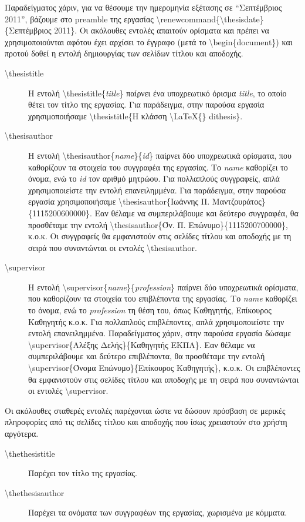 \documentclass{dithesis}
\begin{document}
Παραδείγματος χάριν, για να θέσουμε την ημερομηνία εξέτασης σε ``Σεπτέμβριος
2011'', βάζουμε στο preamble της εργασίας 
\textbackslash{renewcommand}\{\textbackslash{thesisdate}\}\{Σεπτέμβριος 2011\}.
Οι ακόλουθες εντολές απαιτούν ορίσματα και πρέπει να χρησιμοποιούνται αφότου
έχει αρχίσει το έγγραφο (μετά το \textbackslash{begin}\{document\}) και προτού
δοθεί η εντολή δημιουργίας των σελίδων τίτλου και αποδοχής.
\begin{description}
\item[\textbackslash{thesistitle}]
  Η εντολή \textbackslash{thesistitle}\{\textit{title}\} παίρνει ένα 
  υποχρεωτικό όρισμα \textit{title}, το οποίο θέτει τον τίτλο της εργασίας.
  Για παράδειγμα, στην παρούσα εργασία χρησιμοποιήσαμε
  \textbackslash{thesistitle}\{Η κλάσση \textbackslash{LaTeX}\{\} dithesis\}.
\item[\textbackslash{thesisauthor}]
  Η εντολή \textbackslash{thesisauthor}\{\textit{name}\}\{\textit{id}\} παίρνει
  δύο υποχρεωτικά ορίσματα, που καθορίζουν τα στοιχεία του συγγραφέα της
  εργασίας.
  Το \textit{name} καθορίζει το όνομα, ενώ το \textit{id} τον αριθμό μητρώου.
  Για πολλαπλούς συγγραφείς, απλά χρησιμοποιείστε την εντολή επανειλημμένα.
  Για παράδειγμα, στην παρούσα εργασία χρησιμοποιήσαμε
  \textbackslash{thesisauthor}\{Ιωάννης Π. Μαντζουράτος\}\{1115200600000\}.
  Εαν θέλαμε να συμπεριλάβουμε και δεύτερο συγγραφέα, θα προσθέταμε την εντολή 
  \textbackslash{thesisauthor}\{Όν. Π. Επώνυμο\}\{1115200700000\}, κ.ο.κ.
  Οι συγγραφείς θα εμφανιστούν στις σελίδες τίτλου και αποδοχής με τη σειρά
  που συναντώνται οι εντολές \textbackslash{thesisauthor}.
\item[\textbackslash{supervisor}]
  Η εντολή \textbackslash{supervisor}\{\textit{name}\}\{\textit{profession}\} 
  παίρνει δύο υποχρεωτικά ορίσματα, που καθορίζουν τα στοιχεία του επιβλέποντα
  της εργασίας.
  Το \textit{name} καθορίζει το όνομα, ενώ το \textit{profession} τη θέση του,
  όπως Καθηγητής, Επίκουρος Καθηγητής κ.ο.κ.
  Για πολλαπλούς επιβλέποντες, απλά χρησιμοποιείστε την εντολή επανειλημμένα.
  Παραδείγματος χάριν, στην παρούσα εργασία δώσαμε
  \textbackslash{supervisor}\{Αλέξης Δελής\}\{Καθηγητής ΕΚΠΑ\}.
  Εαν θέλαμε να συμπεριλάβουμε και δεύτερο επιβλέποντα, θα προσθέταμε την 
  εντολή \textbackslash{supervisor}\{Όνομα Επώνυμο\}\{Επίκουρος Καθηγητής\}, 
  κ.ο.κ.
  Οι επιβλέποντες θα εμφανιστούν στις σελίδες τίτλου και αποδοχής με τη σειρά
  που συναντώνται οι εντολές \textbackslash{supervisor}.
\end{description}
Οι ακόλουθες σταθερές εντολές παρέχονται ώστε να δώσουν πρόσβαση σε μερικές 
πληροφορίες από τις σελίδες τίτλου και αποδοχής που ίσως χρειαστούν στο χρήστη 
αργότερα.
\begin{description}
\item[\textbackslash{thethesistitle}]
  Παρέχει τον τίτλο της εργασίας.
\item[\textbackslash{thethesisauthor}]
  Παρέχει τα ονόματα των συγγραφέων της εργασίας, χωρισμένα με κόμματα.
\end{description}
\end{document}
